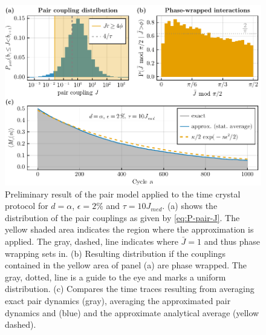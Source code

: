 \begin{figure}%
	\centering
	\includegraphics{gfx/part2/pair-model-timecrystal}
	\caption{Preliminary result of the pair model applied to the time crystal protocol for $d=\alpha$, $\epsilon=2\%$ and $\tau=10J_{med}$. (a) shows the distribution of the pair couplings as given by \autoref{eq:P-pair-J}. The yellow shaded area indicates the region where the approximation is applied. The gray, dashed, line indicates where $\bar{J}=1$ and thus phase wrapping sets in. (b) Resulting distribution if the couplings contained in the yellow area of panel (a) are phase wrapped. The gray, dotted, line is a guide to the eye and marks a uniform distribution. (c) Compares the time traces resulting from averaging exact pair dynamics (gray), averaging the approximated pair dynamics and (blue) and the approximate analytical average (yellow dashed).
	}
	\label{fig:pair-model-timecrystal}
\end{figure}


